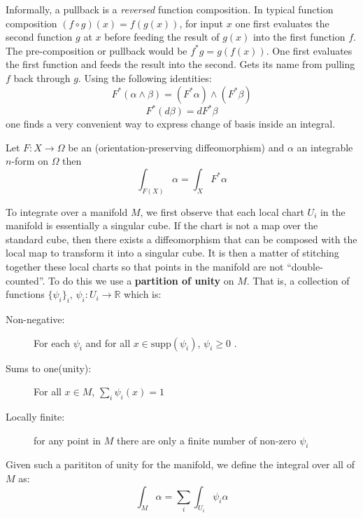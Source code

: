 Informally, a pullback is a \emph{reversed} function composition.
In typical function composition $(f \circ g)(x) = f(g(x))$, for input $x$ one first evaluates the second function $g$ at $x$
before feeding the result of $g(x)$ into the first function $f$.
The pre-composition or pullback would be $f^*g = g(f(x))$. 
One first evaluates the first function and feeds the result into the second.
Gets its name from pulling $f$ back through $g$.
Using the following identities:
\begin{equation}
	F^* (\alpha \wedge \beta ) = (F^* \alpha) \wedge (F^* \beta)
\end{equation}
\begin{equation}
	F^* (d \beta ) = dF^* \beta
\end{equation}
one finds a very convenient way to express change of basis inside an integral.

\begin{theorem}
Let $F : X  \to \Omega$ be an (orientation-preserving diffeomorphism) and $\alpha$ an integrable $n$-form on $\Omega$ then
\begin{equation}
\int_{F(X)} \alpha = \int_X F^* \alpha
\end{equation}
\end{theorem}



To integrate over a manifold $M$, we first observe that each local chart $U_i$ in the manifold is essentially a singular cube.
If the chart is not a map over the standard cube, then there exists a diffeomorphism 
that can be composed with the local map to transform it into a singular cube.
It is then a matter of stitching together these local charts so that points in the manifold are not ``double-counted''.
To do this we use a \textbf{partition of unity} on $M$.
That is, a collection of functions $\{ \psi_i \}_i$, $\psi_i: U_i \to \mathbb{R}$ which is:
\begin{description}
	\item[Non-negative:] For each $\psi_i$ and for all $x \in \text{supp}(\psi_i)$, $\psi_i \geq 0$ .
	\item[Sums to one(unity):] For all $x \in M$, $\sum_i \psi_i(x) = 1$
	\item[Locally finite:] for any point in $M$ there are only a finite number of non-zero $\psi_i$
\end{description}
Given such a parititon of unity for the manifold, we define the integral over all of $M$ as:
\begin{equation}
\int_M \alpha = \sum_i \int_{U_i} \psi_i \alpha
\end{equation}






